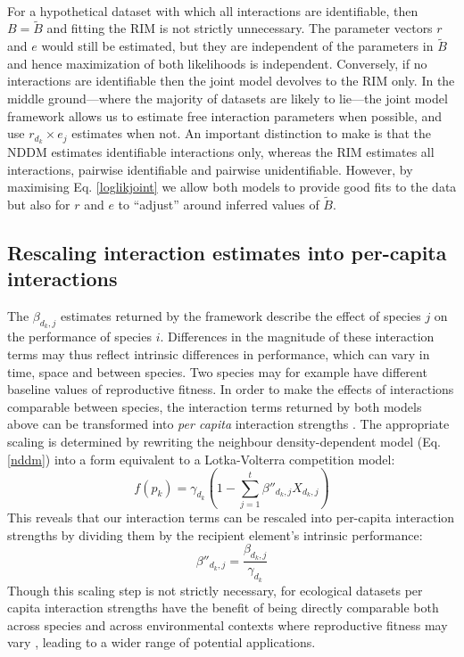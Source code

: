 \documentclass[a4,12pt]{article}
\begin{document}
    \paragraph{}
    For a hypothetical dataset with which all interactions are identifiable, then $B = \tilde B$ and fitting the RIM is not strictly unnecessary. The parameter vectors $r$ and $e$ would still be estimated, but they are independent of the parameters in $\tilde B$ and hence maximization of both likelihoods is independent. Conversely, if no interactions are identifiable then the joint model devolves to the RIM only. In the middle ground---where the majority of datasets are likely to lie---the joint model framework allows us to estimate free interaction parameters when possible, and use $r_{d_k} \times e_j$ estimates when not.  An important distinction to make is that the NDDM estimates identifiable interactions only, whereas the RIM estimates all interactions, pairwise identifiable and pairwise unidentifiable. However, by maximising Eq. \ref{loglikjoint} we allow both models to provide good fits to the data but also for $r$ and $e$ to ``adjust'' around inferred values of $\tilde B$. 


    \subsection{Rescaling interaction estimates into per-capita interactions}

        The $\beta_{d_k, j}$ estimates returned by the framework describe the effect of species $j$ on the performance of species $i$. Differences in the magnitude of these interaction terms may thus reflect intrinsic differences in performance, which can vary in time, space and between species. Two species may for example have different baseline values of reproductive fitness. In order to make the effects of interactions comparable between species, the interaction terms returned by both models above can be transformed into \textit{per capita} interaction strengths \parencite{Laska1998}. The appropriate scaling is determined by rewriting the neighbour density-dependent model (Eq. \ref{nddm}) into a form equivalent to a Lotka-Volterra competition model: 
        \begin{equation}
        f(p_{k}) = \gamma_{d_k} \left ( 1 - \sum_{j=1}^{t} {\beta}''_{d_k, j} X_{d_k, j} \right )
        \label{LVform}
        \end{equation}
        This reveals that our interaction terms can be rescaled into per-capita interaction strengths by dividing them by the recipient element's intrinsic performance:  
        \begin{equation}
        {\beta}''_{d_k, j} = \frac{\beta_{d_k, j}}{\gamma_{d_k}}
        \label{scaling}
        \end{equation}
        Though this scaling step is not strictly necessary, for ecological datasets per capita interaction strengths have the benefit of being directly comparable both across species and across environmental contexts where reproductive fitness may vary \parencite{Wootton2005}, leading to a wider range of potential applications.
\end{document}
